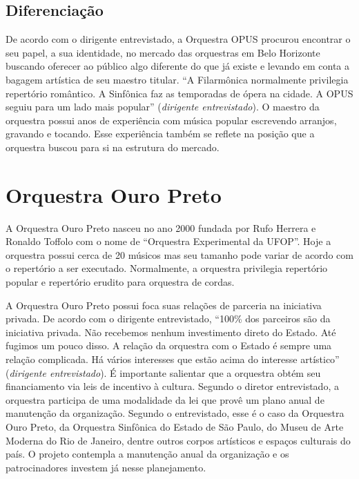 \documentclass[a4paper, 12pt, openright, oneside, german, french, english, brazil]{abntex2}
\begin{document}
	\subsection{Diferenciação}
	
	De acordo com o dirigente entrevistado, a Orquestra OPUS procurou encontrar o seu papel, a sua identidade, no mercado das orquestras em Belo Horizonte buscando oferecer ao público algo diferente do que já existe e levando em conta a bagagem artística de seu maestro titular. ``A Filarmônica normalmente privilegia repertório romântico. A Sinfônica faz as temporadas de ópera na cidade. A OPUS seguiu para um lado mais popular'' (\textit{dirigente entrevistado}). O maestro da orquestra possui anos de experiência com música popular escrevendo arranjos, gravando e tocando. Esse experiência também se reflete na posição que a orquestra buscou para si na estrutura do mercado.
	
	
	\section{Orquestra Ouro Preto}\label{cap:ouropreto}
	
	A Orquestra Ouro Preto nasceu no ano 2000 fundada por Rufo Herrera e Ronaldo Toffolo com o nome de ``Orquestra Experimental da UFOP''. Hoje a orquestra possui cerca de 20 músicos mas seu tamanho pode variar de acordo com o repertório a ser executado. Normalmente, a orquestra privilegia repertório popular e repertório erudito para orquestra de cordas.
	
	A Orquestra Ouro Preto possui foca suas relações de parceria na iniciativa privada. De acordo com o dirigente entrevistado, ``100\% dos parceiros são da iniciativa privada. Não recebemos nenhum investimento direto do Estado. Até fugimos um pouco disso. A relação da orquestra com o Estado é sempre uma relação complicada. Há vários interesses que estão acima do interesse artístico'' (\textit{dirigente entrevistado}). É importante salientar que a orquestra obtém seu financiamento via leis de incentivo à cultura. Segundo o diretor entrevistado, a orquestra participa de uma modalidade da lei que provê um plano anual de manutenção da organização. Segundo o entrevistado, esse é o caso da Orquestra Ouro Preto, da Orquestra Sinfônica do Estado de São Paulo, do Museu de Arte Moderna do Rio de Janeiro, dentre outros corpos artísticos e espaços culturais do país. O projeto contempla a manutenção anual da organização e os patrocinadores investem já nesse planejamento.
	
\end{document}
